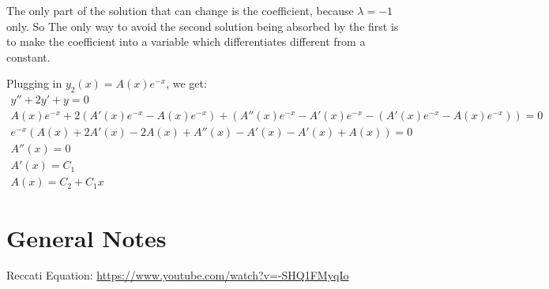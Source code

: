 \documentclass{report}
\begin{document}
        The only part of the solution that can change is the coefficient, because $\lambda = -1$ only. So The only way to avoid the second solution being absorbed by the first is to make the coefficient into a variable which differentiates different from a constant.

        Plugging in $y_2(x) = A(x)e^{-x}$, we get:
        \begin{align}
            y''+2y'+y = 0 \\
            A(x)e^{-x} + 2(A'(x)e^{-x} - A(x)e^{-x}) + (A''(x)e^{-x} - A'(x)e^{-x} - (A'(x)e^{-x} - A(x)e^{-x})) = 0 \\
            e^{-x}(A(x) + 2A'(x) - 2A(x) + A''(x) - A'(x) - A'(x) + A(x)) = 0 \\
            A''(x) = 0 \\
            A'(x) = C_1 \\
            A(x) = C_2 + C_1x
        \end{align}
            
        
        
    \section{General Notes}
        Reccati Equation: \url{https://www.youtube.com/watch?v=-SHQ1FMyqIo}
\end{document}
